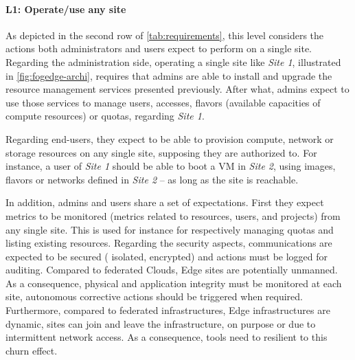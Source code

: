 \paragraph{L1: Operate/use any site}
As depicted in the second row of \cref{tab:requirements}, this level considers
the actions both administrators and users expect to perform on a single site.
Regarding the administration side, operating a single site like \emph{Site 1},
illustrated in \cref{fig:fogedge-archi}, requires that admins are able to
install and upgrade the resource management services presented previously.
After what, admins expect to use those services to manage users, accesses,
flavors (\ie available capacities of compute resources) or quotas, regarding
\emph{Site 1}.

Regarding end-users, they expect to be able to provision compute, network or
storage resources on any single site, supposing they are authorized to. For
instance, a user of \emph{Site 1} should be able to boot a VM in \emph{Site 2},
using images, flavors or networks defined in \emph{Site 2} -- as long as the
site is reachable.

In addition, admins and users share a set of expectations.
First they expect metrics to be monitored (\eg metrics related to resources,
users, and projects) from any single site. This is used for instance for
respectively managing quotas and listing existing resources.
Regarding the security aspects, communications are expected to be secured (\eg
isolated, encrypted) and actions must be logged for auditing. Compared to
federated Clouds, Edge sites are potentially unmanned. As a consequence,
physical and application integrity must be monitored at each site, autonomous
corrective actions should be triggered when required.
Furthermore, compared to federated infrastructures, Edge infrastructures are
dynamic, \ie sites can join and leave the infrastructure, on purpose or due to
intermittent network access. As a consequence, tools need to resilient to this
churn effect.

